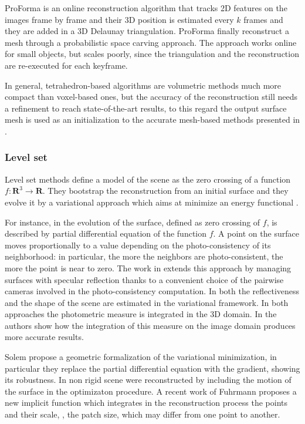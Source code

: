 ProForma \cite{Pan_et_al09} is an online reconstruction algorithm that tracks 2D features on the images frame by frame and their 3D position is estimated every $k$ frames and they are added in a 3D Delaunay triangulation. ProForma finally reconstruct a mesh through a probabilistic space carving approach. The approach works online for small objects, but scales poorly, since the triangulation and the reconstruction are re-executed for each keyframe.

In general, tetrahedron-based algorithms are volumetric methods  much more compact than voxel-based ones, but the accuracy of the reconstruction still needs a refinement to reach state-of-the-art results, to this regard the output surface mesh is used as an initialization to the accurate mesh-based methods presented in \cite{vu_et_al_2012,hiep2009towards,salman2010surface}.

\subsubsection{Level set}
Level set methods define a model of the scene as the zero crossing of a function $f:\mathbf{R}^3\rightarrow\mathbf{R}$. 
They bootstrap the reconstruction from an initial surface and they evolve it by a variational approach which aims at minimize an energy functional \cite{faugeras2002variational,jin2002variational,yezzi2003stereoscopic,fuhrmann2014floating,solem2005geometric,yoon2010joint,pons2007multi}.

For instance, in \cite{faugeras2002variational} the evolution of the surface, defined as zero crossing of $f$, is described by partial differential equation of the function $f$. A point on the surface moves proportionally to a value depending on the photo-consistency of its neighborhood: in particular, the more the neighbors are photo-consistent, the more the point is near to zero.
The work in \cite{jin2002variational} extends this approach by managing surfaces with specular reflection thanks to a convenient choice of the pairwise cameras involved in the photo-consistency computation. In \cite{yoon2010joint} both the reflectiveness and the shape of the scene are estimated in the variational framework.
In both approaches the photometric measure is integrated in the 3D domain. In \cite{yezzi2003stereoscopic} the authors show how the integration of this measure on the image domain produces more accurate results.

Solem \etal \cite{solem2005geometric} propose a geometric formalization of the variational minimization, in particular they replace the partial differential equation with the gradient, showing its robustness.
In \cite{pons2005modelling,pons2007multi} non rigid scene were reconstructed by including the motion of the surface in the optimizaton procedure.
A recent work of Fuhrmann \etal \cite{fuhrmann2014floating} proposes a new implicit function which integrates in the reconstruction process the points and their scale, \eg, the patch size, which may differ from one point to another. 

